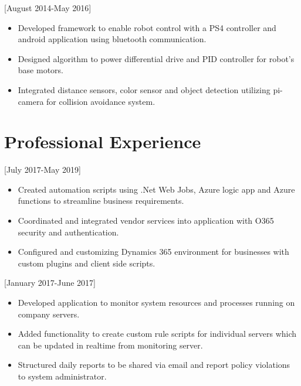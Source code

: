 \documentclass[10pt]{article}
\begin{document}
[August 2014-May 2016]

\begin{itemize}
\item Developed framework to enable robot control with a PS4 controller and android application using bluetooth communication.
\item Designed algorithm to power differential drive and PID controller for robot's base motors.
\item Integrated distance sensors, color sensor and object detection utilizing pi-camera for collision avoidance system.
\end{itemize}

\section{Professional Experience}

[July 2017-May 2019]

\begin{itemize}
\item Created automation scripts using .Net Web Jobs, Azure logic app and Azure functions to streamline business requirements.
\item Coordinated and integrated vendor services into application with O365 security and authentication.
\item Configured and customizing Dynamics 365 environment for businesses with custom plugins and client side scripts.
\end{itemize}

[January 2017-June 2017]

\begin{itemize}
    \item Developed application to monitor system resources and processes running on company servers.
    \item Added functionality to create custom rule scripts for individual servers which can be updated in realtime from monitoring server.
    \item Structured daily reports to be shared via email and report policy violations to system administrator.
\end{itemize}
\end{document}
